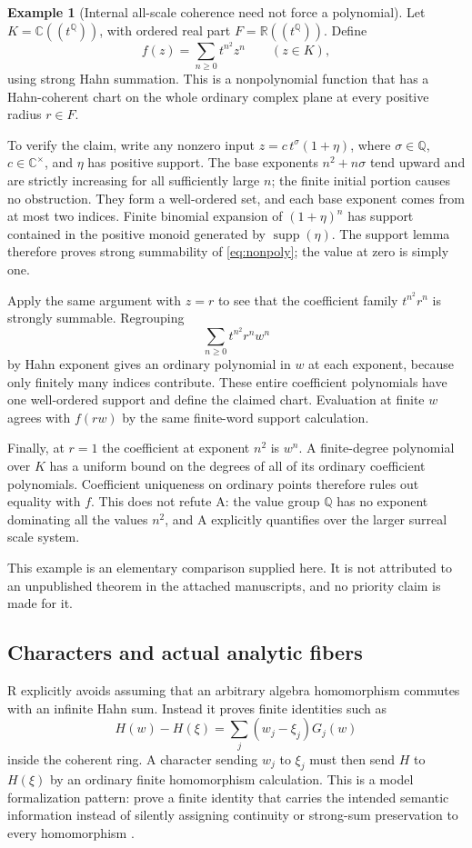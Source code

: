 \documentclass[11pt,letterpaper]{article}
\numberwithin{equation}{section}
\theoremstyle{definition}
\newtheorem{example}[theorem]{Example}
\theoremstyle{remark}
\newcommand{\R}{\mathbb R}
\newcommand{\C}{\mathbb C}
\newcommand{\Q}{\mathbb Q}
\newcommand{\supp}{\operatorname{supp}}
\begin{document}
\begin{example}[Internal all-scale coherence need not force a polynomial]\label{ex:internal}
Let $K=\C((t^\Q))$, with ordered real part $F=\R((t^\Q))$. Define
\begin{equation}\label{eq:nonpoly}
f(z)=\sum_{n\ge0}t^{n^2}z^n\qquad(z\in K),
\end{equation}
using strong Hahn summation. This is a nonpolynomial function that has a Hahn-coherent chart on the whole ordinary complex plane at every positive radius $r\in F$.

To verify the claim, write any nonzero input $z=c\,t^\sigma(1+\eta)$, where $\sigma\in\Q$, $c\in\C^\times$, and $\eta$ has positive support. The base exponents $n^2+n\sigma$ tend upward and are strictly increasing for all sufficiently large $n$; the finite initial portion causes no obstruction. They form a well-ordered set, and each base exponent comes from at most two indices. Finite binomial expansion of $(1+\eta)^n$ has support contained in the positive monoid generated by $\supp(\eta)$. The support lemma therefore proves strong summability of \eqref{eq:nonpoly}; the value at zero is simply one.

Apply the same argument with $z=r$ to see that the coefficient family $t^{n^2}r^n$ is strongly summable. Regrouping
\[
\sum_{n\ge0}t^{n^2}r^n w^n
\]
by Hahn exponent gives an ordinary polynomial in $w$ at each exponent, because only finitely many indices contribute. These entire coefficient polynomials have one well-ordered support and define the claimed chart. Evaluation at finite $w$ agrees with $f(rw)$ by the same finite-word support calculation.

Finally, at $r=1$ the coefficient at exponent $n^2$ is $w^n$. A finite-degree polynomial over $K$ has a uniform bound on the degrees of all of its ordinary coefficient polynomials. Coefficient uniqueness on ordinary points therefore rules out equality with $f$. This does not refute A: the value group $\Q$ has no exponent dominating all the values $n^2$, and A explicitly quantifies over the larger surreal scale system.
\end{example}
This example is an elementary comparison supplied here. It is not attributed to an unpublished theorem in the attached manuscripts, and no priority claim is made for it.

\subsection{Characters and actual analytic fibers}
R explicitly avoids assuming that an arbitrary algebra homomorphism commutes with an infinite Hahn sum. Instead it proves finite identities such as
\[
H(w)-H(\xi)=\sum_j(w_j-\xi_j)G_j(w)
\]
inside the coherent ring. A character sending $w_j$ to $\xi_j$ must then send $H$ to $H(\xi)$ by an ordinary finite homomorphism calculation. This is a model formalization pattern: prove a finite identity that carries the intended semantic information instead of silently assigning continuity or strong-sum preservation to every homomorphism \cite{SourceR}.
\end{document}

